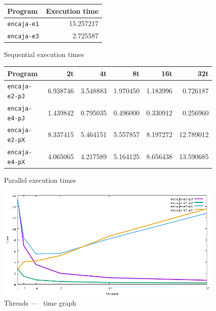 \documentclass[a4paper]{article}
\begin{document}
\begin{figure}[h]
    \centering
    \begin{tabular}{l r}
        Program            & Execution time \\ \hline
        \texttt{encaja-e1} & 15.257217      \\
        \texttt{encaja-e3} &  2.725587      \\ \hline
    \end{tabular}
    \caption{Sequential execution times}
    \label{fig:table-time-seq}
\end{figure}
\begin{figure}[h]
    \centering
    \begin{tabular}{l r r r r r}
        Program               & 2t        & 4t        & 8t        & 16t        & 32t        \\ \hline
        \texttt{encaja-e2-pJ} & 6.938746  & 3.548883  & 1.970450  & 1.183996   &  0.726187  \\
        \texttt{encaja-e4-pJ} & 1.439842  & 0.795035  & 0.496000  & 0.330912   &  0.256960  \\
        \texttt{encaja-e2-pX} & 8.337415  & 5.464151  & 5.557857  & 8.197272   & 12.789012  \\
        \texttt{encaja-e4-pX} & 4.065065  & 4.217589  & 5.164125  & 8.656438   & 13.590685  \\ \hline
    \end{tabular}
    \caption{Parallel execution times}
    \label{fig:table-time}
\end{figure}
\begin{figure}[h]
    \centering
    \includegraphics[width=\textwidth]{../img/time}
    \caption{Threads --- \unskip \, time graph }
    \label{fig:graph-time}
\end{figure}
\end{document}
